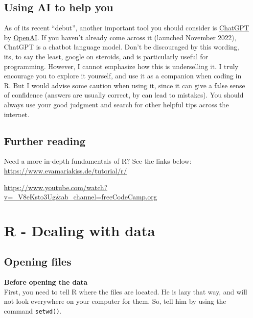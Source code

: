 \documentclass[
]{book}
\begin{document}
\hypertarget{using-ai-to-help-you}{%
\section{Using AI to help you}\label{using-ai-to-help-you}}

As of its recent ``debut'', another important tool you should consider is \href{https://openai.com/blog/chatgpt/}{ChatGPT} by \href{https://openai.com}{OpenAI}. If you haven't already come across it (launched November 2022), ChatGPT is a chatbot language model. Don't be discouraged by this wording, its, to say the least, google on steroids, and is particularly useful for programming. However, I cannot emphasize how this is underselling it. I truly encourage you to explore it yourself, and use it as a companion when coding in R. But I would advise some caution when using it, since it can give a false sense of confidence (answers are usually correct, by can lead to mistakes). You should always use your good judgment and search for other helpful tips across the internet.

\hypertarget{further-reading}{%
\section{Further reading}\label{further-reading}}

Need a more in-depth fundamentals of R?
See the links below:\\
\url{https://www.evamariakiss.de/tutorial/r/}

\url{https://www.youtube.com/watch?v=_V8eKsto3Ug\&ab_channel=freeCodeCamp.org}

\hypertarget{r---dealing-with-data}{%
\chapter{R - Dealing with data}\label{r---dealing-with-data}}

\hypertarget{opening-files}{%
\section{Opening files}\label{opening-files}}

\textbf{Before opening the data}\\
First, you need to tell R where the files are located.
He is lazy that way, and will not look everywhere on your computer for them.
So, tell him by using the command \texttt{setwd()}.
\end{document}
